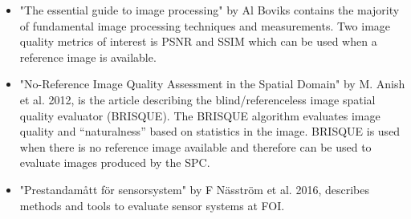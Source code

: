 \begin{itemize}

\item \cite{book:image_processing} "The essential guide to image processing" by Al Boviks contains the majority of fundamental image processing techniques and measurements. Two image quality metrics of interest is PSNR and SSIM which can be used when a reference image is available.
    
\item \cite{article:brisque} "No-Reference Image Quality Assessment
in the Spatial Domain" by M. Anish et al. 2012, is the article describing the blind/referenceless image spatial quality evaluator (BRISQUE). The BRISQUE algorithm evaluates image quality and “naturalness” based on statistics in the image. BRISQUE is used when there is no reference image available and therefore can be used to evaluate images produced by the SPC.  
    
\item \cite{article:FOI_pres_sens} "Prestandamått för sensorsystem" by F Näsström et al. 2016, describes methods and tools to evaluate sensor systems at FOI. 
    
\end{itemize}





